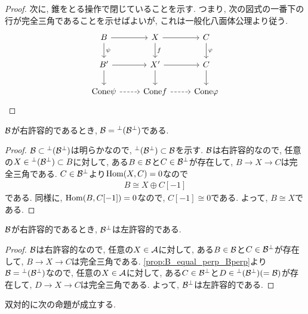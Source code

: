 \documentclass[uplatex, a4paper, 14Q, dvipdfmx]{jsarticle}
\begin{document}
\begin{proof}
  次に, 錐をとる操作で閉じていることを示す.
  つまり, 次の図式の一番下の行が完全三角であることを示せばよいが, これは一般化八面体公理より従う.
  \[\begin{tikzcd}
    B & X & C \\
    {B'} & {X'} & C \\
    {\Cone \psi} & {\Cone f} & {\Cone \varphi}
    \arrow[from=1-1, to=1-2]
    \arrow[from=1-2, to=1-3]
    \arrow[from=2-1, to=2-2]
    \arrow[from=2-2, to=2-3]
    \arrow["\psi", from=1-1, to=2-1]
    \arrow["f", from=1-2, to=2-2]
    \arrow["\varphi", from=1-3, to=2-3]
    \arrow[from=2-1, to=3-1]
    \arrow[from=2-2, to=3-2]
    \arrow[from=2-3, to=3-3]
    \arrow[dashed, from=3-1, to=3-2]
    \arrow[dashed, from=3-2, to=3-3]
  \end{tikzcd}\]
\end{proof}

\begin{lemma} \label{prop:B_equal_perp_Bperp}
  $\mathcal{B}$が右許容的であるとき, $\mathcal{B} = {}^\perp(\mathcal{B}^\perp)$である. 
\end{lemma}

\begin{proof}
  $\mathcal{B} \subset {}^\perp(\mathcal{B}^\perp)$は明らかなので, ${}^\perp(\mathcal{B}^\perp) \subset \mathcal{B}$を示す. 
  $\mathcal{B}$は右許容的なので, 任意の$X \in {}^\perp(\mathcal{B}^\perp) \subset B$に対して, ある$B \in \mathcal{B}$と$C \in \mathcal{B}^\perp$が存在して, $B \to X \to C$は完全三角である. 
  $C \in \mathcal{B}^\perp$より$\mathrm{Hom}(X,C) = 0$なので
  \begin{align*}
    B \cong X \oplus C[-1]
  \end{align*}
  である. 
  同様に, $\mathrm{Hom}(B,C[-1]) = 0$なので, $C[-1] \cong 0$である. 
  よって, $B \cong X$である. 
\end{proof}

\begin{lemma} \label{prop:B_is_right_adm_imply_Bperp_is_left_adm}
  $\mathcal{B}$が右許容的であるとき, $\mathcal{B}^\perp$は左許容的である. 
\end{lemma}

\begin{proof}
  $\mathcal{B}$は右許容的なので, 任意の$X \in \mathcal{A}$に対して, ある$B \in \mathcal{B}$と$C \in \mathcal{B}^\perp$が存在して, $B \to X \to C$は完全三角である.
  \cref{prop:B_equal_perp_Bperp}より$\mathcal{B} = {}^\perp(\mathcal{B}^\perp)$なので, 任意の$X \in \mathcal{A}$に対して, ある$C \in \mathcal{B}^\perp$と$D \in {}^\perp(\mathcal{B}^\perp) (=\mathcal{B})$が存在して, $D \to X \to C$は完全三角である.
  よって, $\mathcal{B}^\perp$は左許容的である. 
\end{proof}

双対的に次の命題が成立する.
\end{document}
